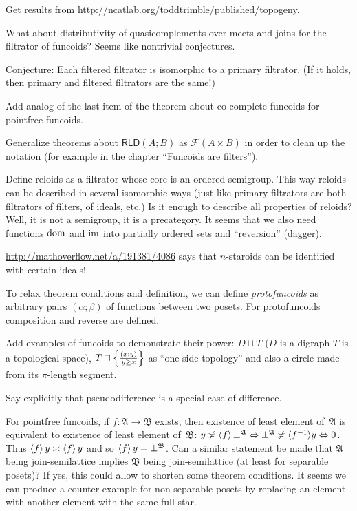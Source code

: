 \documentclass{amsart}
\begin{document}
Get results from \url{http://ncatlab.org/toddtrimble/published/topogeny}.

What about distributivity of quasicomplements over meets and joins for the filtrator of funcoids? Seems like nontrivial conjectures.

Conjecture: Each filtered filtrator is isomorphic to a primary filtrator. (If it holds, then primary and filtered filtrators are the same!)

Add analog of the last item of the theorem about co-complete funcoids for pointfree funcoids.

Generalize theorems about $\mathsf{RLD}(A;B)$ as $\mathscr{F}(A\times B)$ in order to clean up the notation
(for example in the chapter ``Funcoids are filters'').

Define reloids as a filtrator whose core is an ordered semigroup.
This way reloids can be described in several isomorphic ways (just like primary filtrators are both filtrators of filters, of ideals, etc.)
Is it enough to describe all properties of reloids? Well, it is not a semigroup, it is a precategory.
It seems that we also need functions $\operatorname{dom}$ and $\operatorname{im}$ into partially ordered sets and ``reversion'' (dagger).

\url{http://mathoverflow.net/a/191381/4086} says that $n$-staroids can be identified with certain ideals!

To relax theorem conditions and definition, we can define \emph{protofuncoids} as arbitrary pairs $(\alpha;\beta)$ of functions
between two posets. For protofuncoids composition and reverse are defined.

Add examples of funcoids to demonstrate their power:
$D\sqcup T$ ($D$ is a digraph $T$ is a topological space),
$T\sqcap\left\{ \frac{(x;y)}{y\ge x}\right\}$ as ``one-side topology'' and also a circle made from its $\pi$-length segment.

Say explicitly that pseudodifference is a special case of difference.

For pointfree funcoids, if $f:\mathfrak{A}\rightarrow\mathfrak{B}$ exists,
then existence of least element of~$\mathfrak{A}$ is equivalent to existence of least element of~$\mathfrak{B}$:
$y \not\asymp \left\langle f\right\rangle \bot^{\mathfrak{A}} \Leftrightarrow
\bot^{\mathfrak{A}} \not\asymp \langle f^{- 1} \rangle y \Leftrightarrow 0$. Thus
$\left\langle f\right\rangle y \asymp \left\langle f\right\rangle y$ and so $\left\langle f\right\rangle y =
\bot^{\mathfrak{B}}$.
Can a similar statement be made that $\mathfrak{A}$ being join-semilattice implies $\mathfrak{B}$ being join-semilattice
(at least for separable posets)? If yes, this could allow to shorten some theorem conditions.
It seems we can produce a counter-example for non-separable posets by replacing an element with another element with the same full star.
\end{document}
